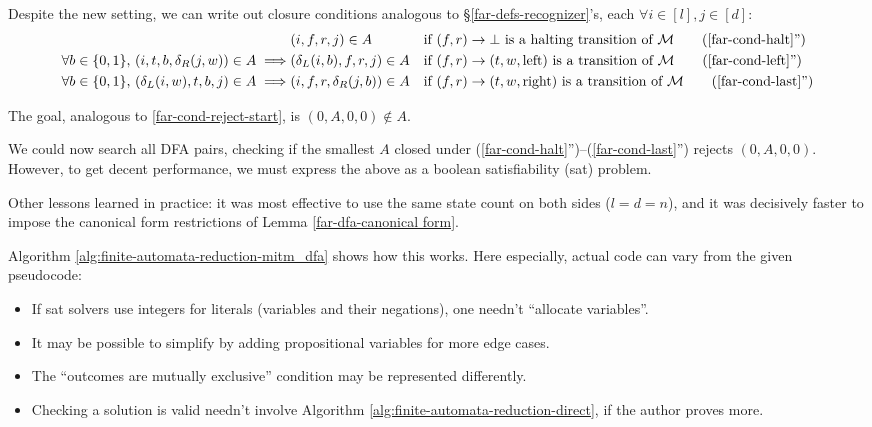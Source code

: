 Despite the new setting, we can write out closure conditions analogous to \S\ref{far-defs-recognizer}'s, each $\forall i\in[l],j\in[d]$:
\begin{align}
                                                                  & (i,f,r,j)\in A
                                                                  &                               & \text{if $(f,r) \to \bot$ is a halting transition of $\mathcal{M}$}
  \tag{\ref{far-cond-halt}''}
  \\
  \forall b \in \{0,1\},\, (i, t, b, \delta_R(j,w))\in A \implies & (\delta_L(i,b), f, r, j)\in A
                                                                  &                               & \text{if $(f,r) \to (t,w,\text{left})$ is a transition of $\mathcal{M}$}
  \tag{\ref{far-cond-left}''}
  \\
  \forall b \in \{0,1\},\, (\delta_L(i,w), t, b, j)\in A \implies & (i, f, r, \delta_R(j,b))\in A
                                                                  &                               & \text{if $(f,r) \to (t,w,\text{right})$ is a transition of $\mathcal{M}$}
  \tag{\ref{far-cond-last}''}
\end{align}

The goal, analogous to \eqref{far-cond-reject-start}, is $(0, A, 0, 0)\notin A$.

We could now search all DFA pairs, checking if the smallest $A$ closed under (\ref{far-cond-halt}'')--(\ref{far-cond-last}'') rejects $(0,A,0,0)$.
However, to get decent performance, we must express the above as a boolean satisfiability ({\sc sat}) problem.

Other lessons learned in practice:
it was most effective to use the same state count on both sides ($l=d=n$),
and it was decisively faster to impose the canonical form restrictions of Lemma \ref{far-dfa-canonical form}.

Algorithm \ref{alg:finite-automata-reduction-mitm_dfa} shows how this works.
Here especially, actual code can vary from the given pseudocode:
\begin{itemize}
  \item If {\sc sat} solvers use integers for literals (variables and their negations), one needn't ``allocate variables''.
  \item It may be possible to simplify by adding propositional variables for more edge cases.
  \item The ``outcomes are mutually exclusive'' condition may be represented differently.
  \item Checking a solution is valid needn't involve Algorithm \ref{alg:finite-automata-reduction-direct}, if the author proves more.
\end{itemize}

